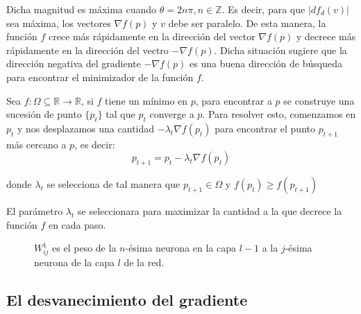 Dicha magnitud es máxima cuando $\theta = 2n\pi, n \in \mathbb{Z}$. Es decir, para que $|df_{d}(v)|$ sea máxima, los vectores $\nabla f(p)$ y $v$ debe ser paralelo. De esta manera, la función $f$ crece más rápidamente en la dirección del vector $\nabla f(p)$ y decrece más rápidamente en la dirección del vectro $-\nabla f(p)$. Dicha situación sugiere que la dirección negativa del gradiente $-\nabla f(p)$ es una buena dirección de búsqueda para encontrar el minimizador de la función $f$.

Sea $f: \Omega \subseteq \mathbb{R} \rightarrow \mathbb{R}$, si $f$ tiene un mínimo en $p$, para encontrar a $p$ se construye una sucesión de punto $\{p_{t}\}$ tal que $p_{t}$ converge a $p$. Para resolver esto, comenzamos en $p_{t}$ y nos desplazamos una cantidad $-\lambda_{t}\nabla f(p_{t})$ para encontrar el punto $p_{t + 1}$ más cercano a $p$, es decir:
$$ p_{t + 1} =p_{t} - \lambda _{t}\nabla f(p_{t}) $$

donde $\lambda_{t}$ se selecciona de tal manera que $p_{t + 1} \in \Omega$ y $f(p_{t}) \geq f(p_{t + 1})$

El parámetro $\lambda_{t}$ se seleccionara para maximizar la cantidad a la que decrece la función $f$ en cada paso.


\begin{figure}[H]
	\centering
    \scalebox{0.6}{}
    \caption{$W^{1}_{ij}$ es el peso de la $n$-ésima neurona en la capa $l - 1$ a la $j$-ésima neurona de la capa $l$ de la red.}
\end{figure}

\subsection{El desvanecimiento del gradiente}
